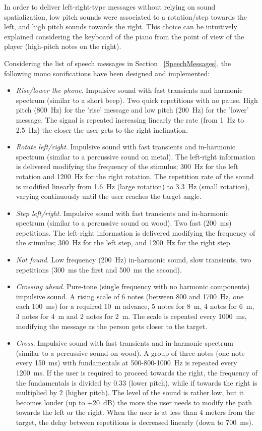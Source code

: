 \documentclass{article}
\begin{document}
In order to deliver left-right-type messages without relying on sound spatialization, low pitch sounds were associated to a rotation/step towards the left, and high pitch sounds towards the right. This choice can be intuitively explained considering the keyboard of the piano from the point of view of the player (high-pitch notes on the right).

Considering the list of speech messages in Section ~\ref{SpeechMessages}, the following mono sonifications have been designed and implemented:

\begin{itemize}
\item \emph{Rise/lower the phone}. Impulsive sound with fast transients and harmonic spectrum (similar to a short beep). Two quick repetitions with no pause. High pitch (800~Hz) for the 'rise' message and low pitch (200~Hz) for the 'lower' message. The signal is repeated increasing linearly the rate (from 1~Hz to 2.5~Hz) the closer the user gets to the right inclination.
\item \emph{Rotate left/right}. Impulsive sound with fast transients and in-harmonic spectrum (similar to a percussive sound on metal). The left-right information is delivered modifying the frequency of the stimulus; 300~Hz for the left rotation and 1200~Hz for the right rotation. The repetition rate of the sound is modified linearly from 1.6~Hz (large rotation) to 3.3~Hz (small rotation), varying continuously until the user reaches the target angle.
\item \emph{Step left/right}. Impulsive sound with fast transients and in-harmonic spectrum (similar to a percussive sound on wood). Two fast (200~ms) repetitions. The left-right information is delivered modifying the frequency of the stimulus; 300~Hz for the left step, and 1200~Hz for the right step.
\item \emph{Not found}. Low frequency (200~Hz) in-harmonic sound, slow transients, two repetitions (300~ms the first and 500~ms the second).
\item \emph{Crossing ahead}. Pure-tone (single frequency with no harmonic components) impulsive sound. A rising scale of 6 notes (between 800 and 1700~Hz, one each 100~ms) for a required 10~m advance, 5 notes for 8~m, 4 notes for 6~m, 3 notes for 4~m and 2 notes for 2~m. The scale is repeated every 1000~ms, modifying the message as the person gets closer to the target.
\item \emph{Cross}. Impulsive sound with fast transients and in-harmonic spectrum (similar to a percussive sound on wood). A group of three notes (one note every 150~ms) with fundamentals at 500-800-1000~Hz is repeated every 1200~ms. If the user is required to proceed towards the right, the frequency of the fundamentals is divided by 0.33 (lower pitch), while if towards the right is multiplied by 2 (higher pitch). The level of the sound is rather low, but it becomes louder (up to +20~dB) the more the user needs to modify the path towards the left or the right. When the user is at less than 4 meters from the target, the delay between repetitions is decreased linearly (down to 700~ms).
\end{itemize}
\end{document}
